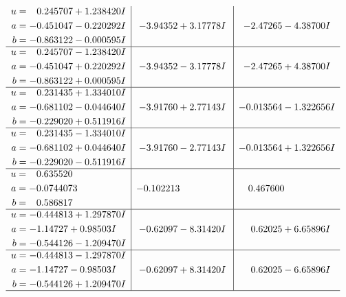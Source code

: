 \documentclass[1p]{elsarticle_modified}
\theoremstyle{definition}
\begin{document}
$$\begin{array}{c|c|c}
\begin{aligned}
u &= \phantom{-}0.245707 + 1.238420 I \\
a &= -0.451047 - 0.220292 I \\
b &= -0.863122 - 0.000595 I\end{aligned}
 & -3.94352 + 3.17778 I & -2.47265 - 4.38700 I \\ \hline\begin{aligned}
u &= \phantom{-}0.245707 - 1.238420 I \\
a &= -0.451047 + 0.220292 I \\
b &= -0.863122 + 0.000595 I\end{aligned}
 & -3.94352 - 3.17778 I & -2.47265 + 4.38700 I \\ \hline\begin{aligned}
u &= \phantom{-}0.231435 + 1.334010 I \\
a &= -0.681102 - 0.044640 I \\
b &= -0.229020 + 0.511916 I\end{aligned}
 & -3.91760 + 2.77143 I & -0.013564 - 1.322656 I \\ \hline\begin{aligned}
u &= \phantom{-}0.231435 - 1.334010 I \\
a &= -0.681102 + 0.044640 I \\
b &= -0.229020 - 0.511916 I\end{aligned}
 & -3.91760 - 2.77143 I & -0.013564 + 1.322656 I \\ \hline\begin{aligned}
u &= \phantom{-}0.635520\phantom{ +0.000000I} \\
a &= -0.0744073\phantom{ +0.000000I} \\
b &= \phantom{-}0.586817\phantom{ +0.000000I}\end{aligned}
 & -0.102213\phantom{ +0.000000I} & \phantom{-}0.467600\phantom{ +0.000000I} \\ \hline\begin{aligned}
u &= -0.444813 + 1.297870 I \\
a &= -1.14727 + 0.98503 I \\
b &= -0.544126 - 1.209470 I\end{aligned}
 & -0.62097 - 8.31420 I & \phantom{-}0.62025 + 6.65896 I \\ \hline\begin{aligned}
u &= -0.444813 - 1.297870 I \\
a &= -1.14727 - 0.98503 I \\
b &= -0.544126 + 1.209470 I\end{aligned}
 & -0.62097 + 8.31420 I & \phantom{-}0.62025 - 6.65896 I\\
 \hline 
 \end{array}$$\newpage
\end{document}
